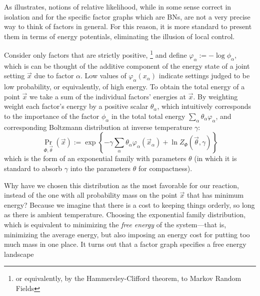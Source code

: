 \documentclass{article}
\theoremstyle{plain}
\theoremstyle{definition}
\theoremstyle{remark}
\numberwithin{equation}{section}
\begin{document}
	As  illustrates, notions of relative likelihood, while in some sense correct in isolation and for the specific factor graphs which are BNs, are not a very precise way to think of factors in general. 
	For this reason, it is more standard to present them in terms of energy potentials, eliminating the illusion of local control. 
	
	Consider only factors that are strictly positive,%
		\footnote{or equivalently, by the Hammersley-Clifford theorem, to Markov Random Fields}
	and define $ \varphi_\alpha := -\log \phi_\alpha$, which is can be thought of the additive component of the energy state of a joint setting $\vec x$ due to factor $\alpha$. 
	Low values of $\varphi_\alpha(x_\alpha)$ indicate settings judged to be low probability, or equivalently, of high energy. 
	To obtain the total energy of a point $\vec x$ we take a sum of the individual factors' energies at $\vec x$. By weighting weight each factor's energy by a positive scalar $\theta_\alpha$, which intuitively corresponds to the importance of the factor $\phi_\alpha$ in the total total energy $\sum_\alpha \theta_\alpha \varphi_\alpha$,
	and corresponding Boltzmann distribution at inverse temperature $\gamma$:
	\[ \Pr_{\Phi, \vec\theta} (\vec x)  := \exp \left\{ -\gamma \sum_\alpha \theta_\alpha \varphi_\alpha(\vec x_\alpha)  + \ln Z_\Phi(\vec \theta, \gamma) \right\} \] 
	which is the form of an exponential family with parameters $\theta$ (in which it is standard to absorb $\gamma$ into the parameters $\theta$ for compactness).
	
	Why have we chosen this distribution as the most favorable for our reaction, instead of the one with all probability mass on the point $\vec x$ that has minimum energy? Because we imagine that there is a cost to keeping things orderly, so long as there is ambient temperature. Choosing the exponential family distribution, which is equivalent to minimizing the \emph{free energy} of the system---that is, minimizing the average energy, but also imposing an energy cost for putting too much mass in one place. It turns out that a factor graph specifies a free energy landscape
	
\end{document}
